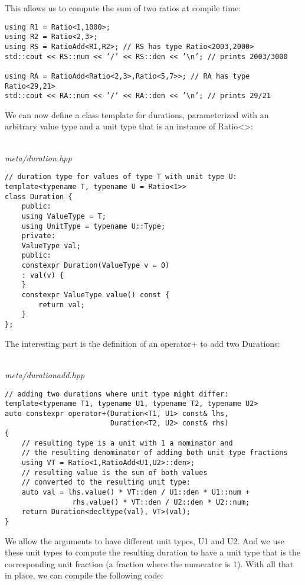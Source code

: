 This allows us to compute the sum of two ratios at compile time:

\begin{lstlisting}[style=styleCXX]
using R1 = Ratio<1,1000>;
using R2 = Ratio<2,3>;
using RS = RatioAdd<R1,R2>; // RS has type Ratio<2003,2000>
std::cout << RS::num << ’/’ << RS::den << ’\n’; // prints 2003/3000

using RA = RatioAdd<Ratio<2,3>,Ratio<5,7>>; // RA has type Ratio<29,21>
std::cout << RA::num << ’/’ << RA::den << ’\n’; // prints 29/21
\end{lstlisting}

We can now define a class template for durations, parameterized with an arbitrary value type and a unit type that is an instance of Ratio<>:

\hspace*{\fill} \\ %
\noindent
\textit{meta/duration.hpp}
\begin{lstlisting}[style=styleCXX]
// duration type for values of type T with unit type U:
template<typename T, typename U = Ratio<1>>
class Duration {
	public:
	using ValueType = T;
	using UnitType = typename U::Type;
	private:
	ValueType val;
	public:
	constexpr Duration(ValueType v = 0)
	: val(v) {
	}
	constexpr ValueType value() const {
		return val;
	}
};
\end{lstlisting}

The interesting part is the definition of an operator+ to add two Durations:

\hspace*{\fill} \\ %
\noindent
\textit{meta/durationadd.hpp}
\begin{lstlisting}[style=styleCXX]
// adding two durations where unit type might differ:
template<typename T1, typename U1, typename T2, typename U2>
auto constexpr operator+(Duration<T1, U1> const& lhs,
						 Duration<T2, U2> const& rhs)
{
	// resulting type is a unit with 1 a nominator and
	// the resulting denominator of adding both unit type fractions
	using VT = Ratio<1,RatioAdd<U1,U2>::den>;
	// resulting value is the sum of both values
	// converted to the resulting unit type:
	auto val = lhs.value() * VT::den / U1::den * U1::num +
				rhs.value() * VT::den / U2::den * U2::num;
	return Duration<decltype(val), VT>(val);
}
\end{lstlisting}

We allow the arguments to have different unit types, U1 and U2. And we use these unit types to compute the resulting duration to have a unit type that is the corresponding unit fraction (a fraction where the numerator is 1). With all that in place, we can compile the following code:

